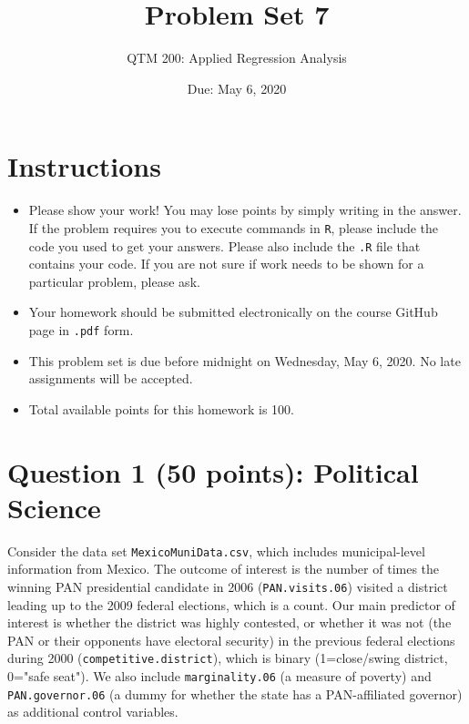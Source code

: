 \documentclass[12pt,letterpaper]{article}
\title{Problem Set 7}
\date{Due: May 6, 2020}
\author{QTM 200: Applied Regression Analysis}
\begin{document}
	\maketitle
	
	\section*{Instructions}
	\begin{itemize}
		\item Please show your work! You may lose points by simply writing in the answer. If the problem requires you to execute commands in \texttt{R}, please include the code you used to get your answers. Please also include the \texttt{.R} file that contains your code. If you are not sure if work needs to be shown for a particular problem, please ask.
		\item Your homework should be submitted electronically on the course GitHub page in \texttt{.pdf} form.
		\item This problem set is due before midnight on Wednesday, May 6, 2020. No late assignments will be accepted.
		\item Total available points for this homework is 100.
	\end{itemize}
	
	\vspace{.5cm}

\section*{Question 1 (50 points): Political Science}	
\noindent Consider the data set \texttt{MexicoMuniData.csv}, which includes municipal-level information from Mexico. The outcome of interest is the number of times the winning PAN presidential candidate in 2006 (\texttt{PAN.visits.06}) visited a district leading up to the 2009 federal elections, which is a count. Our main predictor of interest is whether the district was highly contested, or whether it was not (the PAN or their opponents have electoral security) in the previous federal elections during 2000 (\texttt{competitive.district}), which is binary (1=close/swing district, 0="safe seat"). We also include \texttt{marginality.06} (a measure of poverty) and \texttt{PAN.governor.06} (a dummy for whether the state has a PAN-affiliated governor) as additional control variables. 
\end{document}
